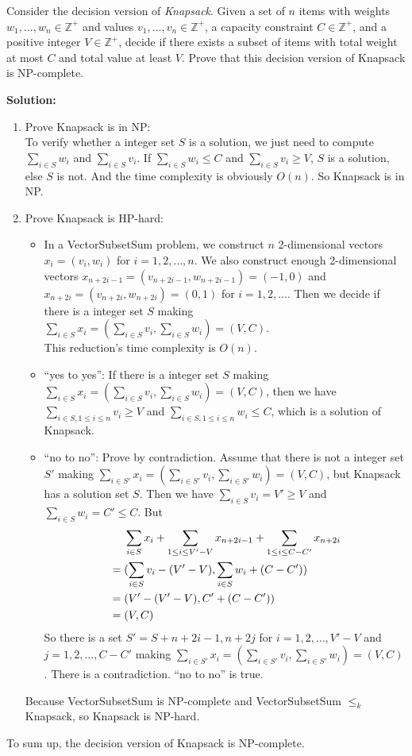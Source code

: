\documentclass{oxmathproblems}
\begin{document}
\begin{questions}
\miquestion
Consider the decision version of \emph{Knapsack}. Given a set of $n$ items with weights $w_1,\ldots,w_n\in\mathbb{Z}^+$ and values $v_1,\ldots,v_n\in\mathbb{Z}^+$, a capacity constraint $C\in\mathbb{Z}^+$, and a positive integer $V\in\mathbb{Z}^+$, decide if there exists a subset of items with total weight at most $C$ and total value at least $V$. Prove that this decision version of Knapsack is NP-complete.

\textbf{Solution:}
\begin{enumerate}
  \item Prove Knapsack is in NP:\\
  To verify whether a integer set $S$ is a solution, we just need to compute $\sum_{i\in S}w_i$ and $\sum_{i\in S}v_i$. If $\sum_{i\in S}w_i \leq C$ and $\sum_{i\in S}v_i \geq V$, $S$ is a solution, else $S$ is not. And the time complexity is obviously $O(n)$. So Knapsack is in NP.
  \item Prove Knapsack is HP-hard:
  \begin{itemize}
    \item In a VectorSubsetSum problem, we construct $n$ 2-dimensional vectors $x_i = (v_i, w_i)$ for $i = 1, 2, \ldots, n$. We also construct enough 2-dimensional vectors $x_{n+2i-1} = (v_{n+2i-1}, w_{n+2i-1}) = (-1, 0)$ and $x_{n+2i} = (v_{n+2i}, w_{n+2i}) = (0, 1)$ for $i = 1, 2, \ldots$. Then we decide if there is a integer set $S$ making $\sum_{i\in S}x_i = (\sum_{i\in S}v_i, \sum_{i\in S}w_i) = (V, C)$.\\
    This reduction's time complexity is $O(n)$.
    \item ``yes to yes'': If there is a integer set $S$ making $\sum_{i\in S}x_i = (\sum_{i\in S}v_i, \sum_{i\in S}w_i) = (V, C)$, then we have $\sum_{i\in S, 1 \leq i \leq n}v_i \geq V$ and $\sum_{i\in S, 1 \leq i \leq n}w_i \leq C$, which is a solution of Knapsack.
    \item ``no to no'': Prove by contradiction. Assume that there is not a integer set $S'$ making $\sum_{i\in S'}x_i = (\sum_{i\in S'}v_i, \sum_{i\in S'}w_i) = (V, C)$, but Knapsack has a solution set $S$. Then we have $\sum_{i\in S}v_i = V' \geq V$ and $\sum_{i\in S}w_i = C' \leq C$. But
    \begin{align}
    &\ \ \ \ \sum_{i\in S}x_i + \sum_{1\leq i\leq V'-V}x_{n+2i-1} + \sum_{1\leq i\leq C-C'}x_{n+2i} \notag \\
    &=(\sum_{i\in S}v_i - (V'-V), \sum_{i\in S}w_i + (C-C')) \notag \\
    &=(V' - (V'-V), C' + (C-C')) \notag \\
    &=(V, C) \notag
    \end{align}
    So there is a set $S' = S + {n+2i-1, n+2j}$ for $i = 1, 2, \ldots, V'-V$ and $j = 1, 2, \ldots, C-C'$ making $\sum_{i\in S'}x_i = (\sum_{i\in S'}v_i, \sum_{i\in S'}w_i) = (V, C)$. There is a contradiction. ``no to no'' is true.
  \end{itemize}
  Because VectorSubsetSum is NP-complete and VectorSubsetSum $\leq_k$ Knapsack, so Knapsack is NP-hard.
\end{enumerate}
To sum up, the decision version of Knapsack is NP-complete.


\end{questions}
\end{document}
